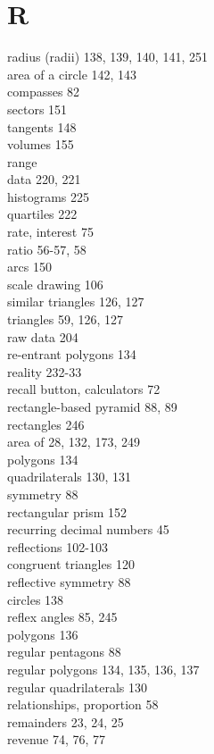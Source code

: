 \documentclass[10pt]{article}
\begin{document}
\section*{R}
radius (radii) 138, 139, 140, 141, 251\\
area of a circle 142, 143\\
compasses 82\\
sectors 151\\
tangents 148\\
volumes 155\\
range\\
data 220, 221\\
histograms 225\\
quartiles 222\\
rate, interest 75\\
ratio 56-57, 58\\
arcs 150\\
scale drawing 106\\
similar triangles 126, 127\\
triangles 59, 126, 127\\
raw data 204\\
re-entrant polygons 134\\
reality 232-33\\
recall button, calculators 72\\
rectangle-based pyramid 88, 89\\
rectangles 246\\
area of 28, 132, 173, 249\\
polygons 134\\
quadrilaterals 130, 131\\
symmetry 88\\
rectangular prism 152\\
recurring decimal numbers 45\\
reflections 102-103\\
congruent triangles 120\\
reflective symmetry 88\\
circles 138\\
reflex angles 85, 245\\
polygons 136\\
regular pentagons 88\\
regular polygons 134, 135, 136, 137\\
regular quadrilaterals 130\\
relationships, proportion 58\\
remainders 23, 24, 25\\
revenue 74, 76, 77\\
\end{document}
